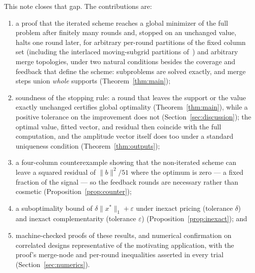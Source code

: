 \documentclass[pdflatex,sn-mathphys-num]{sn-jnl}
\theoremstyle{thmstyleone}
\theoremstyle{thmstyletwo}
\begin{document}
This note closes that gap. The contributions are:
\begin{enumerate}
\item[(i)] a proof that the iterated scheme reaches a global minimizer
of the full problem after finitely many rounds and, stopped on an
unchanged value, halts one round later, for arbitrary
per-round partitions of the fixed column set (including the interlaced
moving-subgrid partitions of~\cite{brookes2006}) and arbitrary merge
topologies, under two natural conditions besides the coverage and
feedback that define the scheme: subproblems are solved exactly, and
merge steps union \emph{whole} supports (Theorem~\ref{thm:main});
\item[(ii)] soundness of the stopping rule: a round that leaves the
support or the value exactly unchanged certifies global optimality
(Theorem~\ref{thm:main}), while a positive tolerance on the improvement
does not (Section~\ref{sec:discussion}); the optimal value, fitted vector, and residual
then coincide with the full computation, and the amplitude vector
itself does too under a standard uniqueness condition
(Theorem~\ref{thm:outputs});
\item[(iii)] a four-column counterexample showing that the non-iterated
scheme can leave a squared residual of $\lVert b\rVert^2/51$ where the
optimum is zero --- a fixed fraction of the signal --- so the feedback
rounds are necessary rather than cosmetic
(Proposition~\ref{prop:counter});
\item[(iv)] a suboptimality bound of
$\delta\lVert x^*\rVert_1+\varepsilon$ under inexact pricing
(tolerance $\delta$) and inexact complementarity (tolerance
$\varepsilon$) (Proposition~\ref{prop:inexact}); and
\item[(v)] machine-checked proofs of these results, and numerical
confirmation on correlated designs representative of the motivating
application, with the proof's merge-node and per-round inequalities
asserted in every trial (Section~\ref{sec:numerics}).
\end{enumerate}
\end{document}
